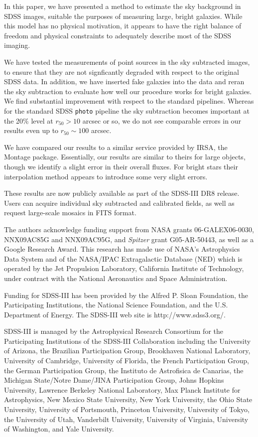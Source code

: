 \documentclass[10pt,preprint]{aastex}
\begin{document}
In this paper, we have presented a method to estimate the sky
background in SDSS images, suitable the purposes of measuring large,
bright galaxies.  While this model has no physical motivation, it
appears to have the right balance of freedom and physical constraints
to adequately describe most of the SDSS imaging.

We have tested the measurements of point sources in the sky subtracted
images, to ensure that they are not signficantly degraded with respect
to the original SDSS data.  In addition, we have inserted fake
galaxies into the data and reran the sky subtraction to evaluate how
well our procedure works for bright galaxies.  We find substantial
improvement with respect to the standard pipelines.  Whereas for the
standard SDSS {\tt photo} pipeline the sky subtraction becomes
important at the 20\% level at $r_{50}>10$ arcsec or so, we do not see
comparable errors in our results even up to $r_{50} \sim 100$ arcsec.

We have compared our results to a similar service provided by IRSA,
the Montage package. Essentially, our results are similar to theirs
for large objects, though we identify a slight error in their overall
fluxes. For bright stars their interpolation method appears to
introduce some very slight errors.

These results are now publicly available as part of the SDSS-III DR8
release. Users can acquire individual sky subtracted and calibrated
fields, as well as request large-scale mosaics in FITS format.

\acknowledgments

The authors acknowledge funding support from NASA grants
06-GALEX06-0030, NNX09AC85G and NNX09AC95G, and \emph{Spitzer} grant
G05-AR-50443, as well as a Google Research Award. This research has
made use of NASA's Astrophysics Data System and of the NASA/IPAC
Extragalactic Database (NED) which is operated by the Jet Propulsion
Laboratory, California Institute of Technology, under contract with
the National Aeronautics and Space Administration.

Funding for SDSS-III has been provided by the Alfred P. Sloan
Foundation, the Participating Institutions, the National Science
Foundation, and the U.S. Department of Energy. The SDSS-III web site
is http://www.sdss3.org/.

SDSS-III is managed by the Astrophysical Research Consortium for the
Participating Institutions of the SDSS-III Collaboration including the
University of Arizona, the Brazilian Participation Group, Brookhaven
National Laboratory, University of Cambridge, University of Florida,
the French Participation Group, the German Participation Group, the
Instituto de Astrofisica de Canarias, the Michigan State/Notre
Dame/JINA Participation Group, Johns Hopkins University, Lawrence
Berkeley National Laboratory, Max Planck Institute for Astrophysics,
New Mexico State University, New York University, the Ohio State
University, University of Portsmouth, Princeton University, University
of Tokyo, the University of Utah, Vanderbilt University, University of
Virginia, University of Washington, and Yale University.
\end{document}
